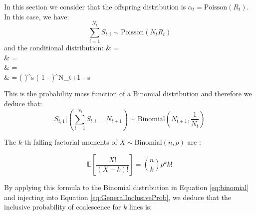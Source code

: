 \documentclass{article}
\let\oldalign\align
\let\oldendalign\endalign
\renewenvironment{align}{\linenomathNonumbers\oldalign}{\oldendalign\endlinenomath}
\renewcommand{\eqref}[1]{\ref{#1}}
\begin{document}
In this section we consider that the offspring distribution is $\alpha_t = \text{Poisson}(R_t)$.
In this case, we have: 
	\begin{equation}
		\sum_{i=1}^{N_t} S_{t,i} \sim \text{Poisson}(N_t R_t)
	\end{equation}
and the conditional distribution:
{\allowdisplaybreaks
	\begin{align}
	\allowdisplaybreaks
		\bigg[S_{t,1} = s \bigg| \sum_{i=1}^{N_t} S_{t,i} = N_{t+1} \bigg]
			& =  \nonumber\\
			& =  \nonumber\\
			& =  \nonumber\\
			& =  \left(  \right)^s \left( 1 -  \right)^{N_{t+1} - s}
	\end{align}
}

This is the probability mass function of a Binomial distribution and therefore we deduce that:
	\begin{equation}
		S_{t,1} \bigg| \left(\sum_{i=1}^{N_t} S_{t,i} = N_{t+1}\right) \sim \text{Binomial}\left(N_{t+1}, \frac{1}{N_t}\right)\label{eq:binomial}
	\end{equation}

The $k$-th falling factorial moments of $X \sim \mathrm{Binomial}(n,p)$ are
\citep{Potts1953}:

\begin{equation}
	\mathbb{E}\left[\frac{X!}{(X-k)!}\right]=\binom{n}{k} p^k k!
\end{equation}

By applying this formula to the Binomial distribution in Equation \eqref{eq:binomial}
and injecting into Equation \eqref{eq:GeneralInclusiveProb}, we deduce that the inclusive probability of coalescence for $k$ lines is:
\end{document}
